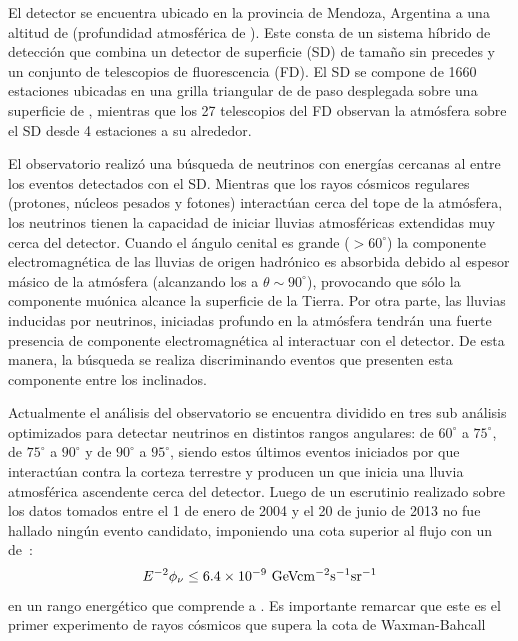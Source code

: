 	El detector se encuentra ubicado en la provincia de Mendoza, Argentina a una altitud de  (profundidad atmosf\'erica de ).
	Este consta de un sistema h\'ibrido de detecci\'on que combina un detector de superficie (SD) de tama\~no sin precedes y un conjunto de telescopios de fluorescencia (FD).
	El SD se compone de 1660 estaciones \cher{} ubicadas en una grilla triangular de  de paso desplegada sobre una superficie de , mientras que los 27 telescopios del FD observan la atm\'osfera sobre el SD desde 4 estaciones a su alrededor.
	\fi %


	El observatorio realiz\'o una b\'usqueda de neutrinos con energ\'ias cercanas al  entre los eventos detectados con el SD.
	Mientras que los rayos c\'osmicos regulares (protones, n\'ucleos pesados y fotones) interact\'uan cerca del tope de la atm\'osfera, los neutrinos tienen la capacidad de iniciar lluvias atmosf\'ericas extendidas muy cerca del detector. 
	Cuando el \'angulo cenital es grande ($>60^\circ$) la componente electromagn\'etica de las lluvias de origen hadr\'onico es absorbida debido al espesor m\'asico de la atm\'osfera (alcanzando los  a $\theta\sim90^\circ$), provocando que s\'olo la componente mu\'onica alcance la superficie de la Tierra.
	Por otra parte, las lluvias inducidas por neutrinos, iniciadas profundo en la atm\'osfera tendr\'an una fuerte presencia de componente electromagn\'etica al interactuar con el detector.
	De esta manera, la b\'usqueda se realiza discriminando eventos que presenten esta componente entre los inclinados. 
	
	Actualmente el an\'alisis del observatorio se encuentra dividido en tres sub an\'alisis optimizados para detectar neutrinos en distintos rangos angulares: de $60^\circ$ a $75^\circ$, de $75^\circ$ a $90^\circ$ y de $90^\circ$ a $95^\circ$, siendo estos \'ultimos eventos iniciados por \nutau{} que interact\'uan contra la corteza terrestre y producen un \tauon{} que inicia una lluvia atmosf\'erica ascendente cerca del detector.
	Luego de un escrutinio realizado sobre los datos tomados entre el 1 de enero de 2004 y el 20 de junio de 2013 no fue hallado ning\'un evento candidato, imponiendo una cota superior al flujo con un  de~\cite{Aab:2015kma}:
	\begin{equation}
	 E^{-2}\phi_\nu \leq 6.4\times10^{-9}{\rm\ GeVcm^{-2}s^{-1}sr^{-1}}
	\end{equation}
	en un rango energ\'etico que comprende  a .
	Es importante remarcar que este es el primer experimento de rayos c\'osmicos que supera la cota de Waxman-Bahcall
	\fi 


